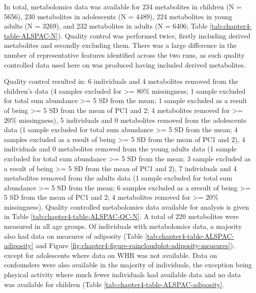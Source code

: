 \documentclass[11pt,twoside]{bristolthesis}
\begin{document}
In total, metabolomics data was available for 234 metabolites in children (N = 5656), 230 metabolites in adolescents (N = 4489), 224 metabolites in young adults (N = 3269), and 232 metabolites in adults (N = 6406; Table \ref{tab:chapter4-table-ALSPAC-N}). Quality control was performed twice, firstly including derived metabolites and secondly excluding them. There was a large difference in the number of representative features identified across the two runs, as such quality controlled data used here on was produced having included derived metabolites.

Quality control resulted in: 6 individuals and 4 metabolites removed from the children's data (4 samples excluded for \textgreater{}= 80\% missingness; 1 sample excluded for total sum abundance \textgreater{}= 5 SD from the mean; 1 sample excluded as a result of being \textgreater{}= 5 SD from the mean of PC1 and 2; 4 metabolites removed for \textgreater{}= 20\% missingness), 5 individuals and 0 metabolites removed from the adolescents data (1 sample excluded for total sum abundance \textgreater{}= 5 SD from the mean; 4 samples excluded as a result of being \textgreater{}= 5 SD from the mean of PC1 and 2), 4 individuals and 0 metabolites removed from the young adults data (1 sample excluded for total sum abundance \textgreater{}= 5 SD from the mean; 3 sample excluded as a result of being \textgreater{}= 5 SD from the mean of PC1 and 2), 7 individuals and 4 metabolites removed from the adults data (1 sample excluded for total sum abundance \textgreater{}= 5 SD from the mean; 6 samples excluded as a eresult of being \textgreater{}= 5 SD from the mean of PC1 and 2; 4 metabolites removed for \textgreater{}= 20\% missingness). Quality controlled metabolomics data available for analysis is given in Table \ref{tab:chapter4-table-ALSPAC-QC-N}. A total of 220 metabolites were measured in all age groups. Of individuals with metabolomics data, a majority also had data on measures of adiposity (Table \ref{tab:chapter4-table-ALSPAC-adiposity} and Figure \ref{fig:chapter4-figure-raincloudplot-adiposity-measures}), except for adolescents where data on WHR was not available. Data on confounders were also available in the majority of individuals, the exception being phsyical activity where much fewer individuals had available data and no data was available for children (Table \ref{tab:chapter4-table-ALSPAC-adiposity}.
\end{document}
